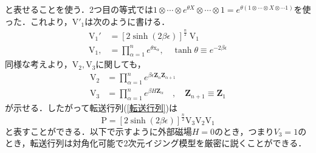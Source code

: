 \documentclass[a4paper,11pt]{jsreport}
\begin{document}
と表せることを使う．2つ目の等式では$1 \otimes \cdots \otimes e^{\theta X} \otimes \cdots \otimes 1 = e^{\theta (1 \otimes \cdots \otimes X \otimes \cdots 1)}$を使った．これより，$\mathrm{V}'_1$は次のように書ける．
\begin{align}
  \mathrm{V}_1'
   & =[2 \sinh (2 \beta \epsilon)]^{\frac{n}{2}} \mathrm{~V}_1                               \\
  \mathrm{V}_1,
   & =\prod_{\alpha=1}^n e^{\theta \mathrm{x}_{\alpha}}, \quad \tanh \theta \equiv e^{-2 \beta \epsilon}
  \label{V1}
\end{align}
同様な考えより，$\mathrm{V}_2, \mathrm{V}_3$に関しても，
\begin{align}
  \mathrm{V}_2
   & =\prod_{\alpha=1}^n e^{\beta \epsilon \mathbf{Z}_\alpha \mathbf{Z}_{\alpha+1}} \label{V2}\\
  \mathrm{V}_3
   & =\prod_{\alpha=1}^n e^{\beta H \mathbf{Z}_\alpha} \quad, \quad \mathbf{Z}_{n+1} \equiv \mathbf{Z}_1 \label{V3}
\end{align}
が示せる．したがって転送行列(\ref{転送行列})は
\begin{equation}
  \mathrm{P}
  = [2 \sinh (2 \beta \epsilon)]^{\frac{n}{2}} \mathrm{V}_3 \mathrm{V}_2 \mathrm{V}_1
  \label{行列P最終形態}
\end{equation}
と表すことができる．以下で示すように外部磁場$H=0$のとき，つまり$V_3 = 1$のとき，転送行列は対角化可能で2次元イジング模型を厳密に説くことができる．
\end{document}
